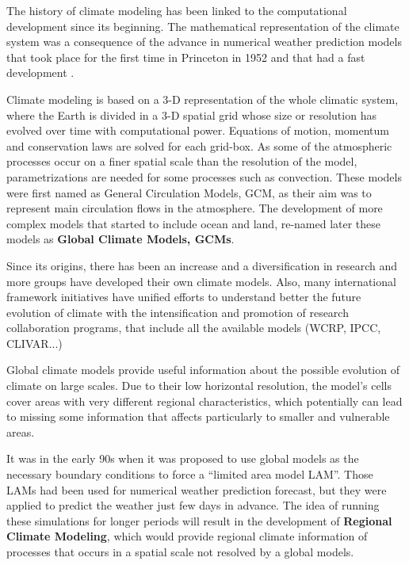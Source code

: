 The history of climate modeling has been linked to the computational development since its beginning. The mathematical representation of the climate system was a consequence of the advance in numerical weather prediction models that took place for the first time in Princeton in 1952 and that had a fast development \cite*{Edwards2011}. %

Climate modeling is based on a 3-D representation of the whole climatic system, where the Earth is divided  in a 3-D spatial grid whose size or resolution has evolved over time with computational power. Equations of motion, momentum and conservation laws are solved for each grid-box. As some of the atmospheric processes occur on a finer spatial scale than the resolution of the model, parametrizations are needed for some processes such as convection. These models were first named as General Circulation Models, GCM, as their aim was to represent main circulation flows in the atmosphere. The development of more complex models that started to include ocean and land, re-named later these models as \textbf{Global Climate Models, GCMs}. 

Since its origins, there has been an increase and a diversification in research and more groups have developed their own climate models. Also, many international framework initiatives have unified efforts to understand better the future evolution of climate with the intensification and promotion of research collaboration programs, that include all the available  models (WCRP, IPCC, CLIVAR...)   

Global climate models provide useful information about the possible evolution of climate on large scales. Due to their low horizontal resolution, the model's cells cover areas with very different regional characteristics, which potentially can lead to missing some information that affects particularly to smaller and vulnerable areas.

It was in the early 90s \cite*{Dickinson1989, Giorgi1990} when it was proposed to use global models as the necessary boundary conditions to force a ``limited area model LAM''. Those LAMs had been used for numerical weather prediction forecast, but they were applied to predict the weather just few days in advance. The idea of running these simulations for longer periods will result in the development of \textbf{Regional Climate Modeling}, which would provide regional climate information of processes that occurs in a spatial scale not resolved by a global models.

